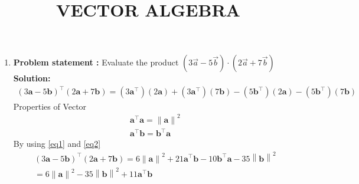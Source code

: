 \documentclass[12pt]{article}\usepackage{graphicx}
\title{\mytitle}
\let\vec\mathbf
\let\vec\mathbf
\providecommand{\norm}[1]{\left\lVert#1\right\rVert}
\providecommand{\brak}[1]{\ensuremath{\left(#1\right)}}
\newcommand{\solution}{\noindent \textbf{Solution: }}
\begin{document}
\begin{center}
\title{\textbf{VECTOR ALGEBRA}}
\maketitle
\end{center}
\begin{enumerate}
\item\textbf{Problem statement :} Evaluate the product $\brak{3\overrightarrow{a}-5\overrightarrow{b}}\cdot\brak{2\overrightarrow{a}+7\overrightarrow{b}}$
\solution
\begin{align}
    \brak{3\vec{a}-5\vec{b}}^{\top}\brak{2\vec{a}+7\vec{b}}= \brak{3\vec{a}^{\top}}\brak{2\vec{a}}+\brak{3\vec{a}^{\top}}\brak{7\vec{b}}-\brak{5\vec{b}^{\top}}\brak{2\vec{a}}-\brak{5\vec{b}^{\top}}\brak{7\vec{b}}
\end{align}
Properties of Vector
\begin{align}
    \vec{a}^{\top}\vec{a} = \norm{\vec{a}}^2
    \label{eq1}  
    \\
    \vec{a}^{\top}\vec{b} = \vec{b}^{\top}\vec{a}
    \label{eq2}
\end{align}
By using \eqref{eq1} and \eqref{eq2}
\begin{align}
    \brak{3\vec{a}-5\vec{b}}^{\top}\brak{2\vec{a}+7\vec{b}} = 6\norm{\vec{a}}^2 +21\vec{a}^{\top}\vec{b}-10\vec{b}^{\top}\vec{a}-35\norm{\vec{b}}^2 \\
     =6\norm{\vec{a}}^2-35\norm{\vec{b}}^2+11\vec{a}^{\top}\vec{b}
\end{align}
\end{enumerate}
\end{document}

